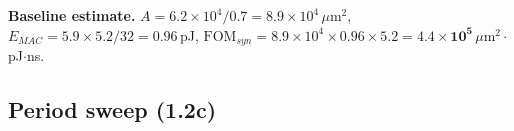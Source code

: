 \textbf{Baseline estimate.}
$A = 6.2\times10^4/0.7 = 8.9\times10^4\,\mu$m$^2$,
$E_{MAC} = 5.9 \times 5.2 / 32 = 0.96$\,pJ,
$\mathrm{FOM}_{syn} = 8.9\times10^4 \times 0.96 \times 5.2 = \mathbf{4.4\times10^5}\,\mu$m$^2\cdot$pJ$\cdot$ns.

\subsection{Period sweep (1.2c)}

